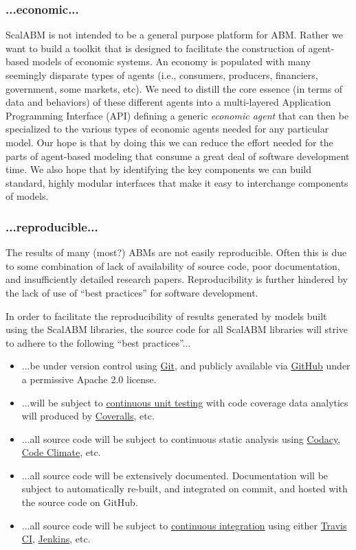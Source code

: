 \documentclass[11pt]{amsart}
\begin{document}
\subsubsection{...economic...}
ScalABM is not intended to be a general purpose platform for ABM. Rather we want to build a toolkit that is designed to facilitate the construction of agent-based models of economic systems. An economy is populated with many seemingly disparate types of agents (i.e., consumers, producers, financiers, government, some markets, etc). We need to distill the core essence (in terms of data and behaviors) of these different agents into a multi-layered Application Programming Interface (API) defining a generic \textit{economic agent} that can then be specialized to the various types of economic agents needed for any particular model. Our hope is that by doing this we can reduce the effort needed for the parts of agent-based modeling that consume a great deal of software development time.  We also hope that by identifying the key components we can build standard, highly modular interfaces that make it easy to interchange components of models.

\subsubsection{...reproducible...}
The results of many (most?) ABMs are not easily reproducible. Often this is due to some combination of lack of availability of source code, poor documentation, and insufficiently detailed research papers. Reproducibility is further hindered by the lack of use of ``best practices'' for software development.

In order to facilitate the reproducibility of results generated by models built using the ScalABM libraries, the source code for all ScalABM libraries will strive to adhere to the following ``best practices''...
\begin{itemize}
    \item ...be under version control using \href{https://git-scm.com/}{Git}, and publicly available via \href{https://github.com/}{GitHub} under a permissive Apache 2.0 license.
    \item ...will be subject to \href{https://en.wikipedia.org/wiki/Unit_testing}{continuous unit testing} with code coverage data analytics will produced by \href{https://coveralls.io/}{Coveralls}, etc.
    \item ...all source code will be subject to continuous static analysis using \href{https://www.codacy.com/login}{Codacy}, \href{https://codeclimate.com/}{Code Climate}, etc.
    \item ...all source code will be extensively documented. Documentation will be subject to automatically re-built, and integrated on commit, and hosted with the source code on GitHub.
    \item ...all source code will be subject to \href{https://en.wikipedia.org/wiki/Continuous_integration}{continuous integration} using either \href{https://travis-ci.org/}{Travis CI}, \href{https://jenkins-ci.org/}{Jenkins}, etc.
\end{itemize}
    
\end{document}
